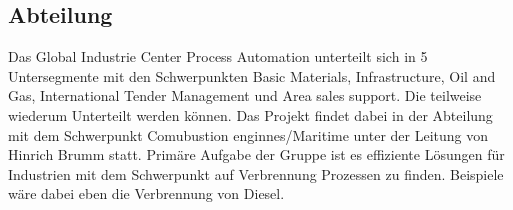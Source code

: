 \subsection{Abteilung}
Das Global Industrie Center Process Automation unterteilt sich in 5 Untersegmente mit den Schwerpunkten Basic Materials, Infrastructure, Oil and Gas, International Tender Management und Area sales support. Die teilweise wiederum Unterteilt werden können. 
Das Projekt findet dabei in der Abteilung mit dem Schwerpunkt Comubustion enginnes/Maritime unter der Leitung von Hinrich Brumm statt. Primäre Aufgabe der Gruppe ist es effiziente Lösungen für Industrien mit dem Schwerpunkt auf Verbrennung Prozessen zu finden. Beispiele wäre dabei eben die Verbrennung von Diesel. 

